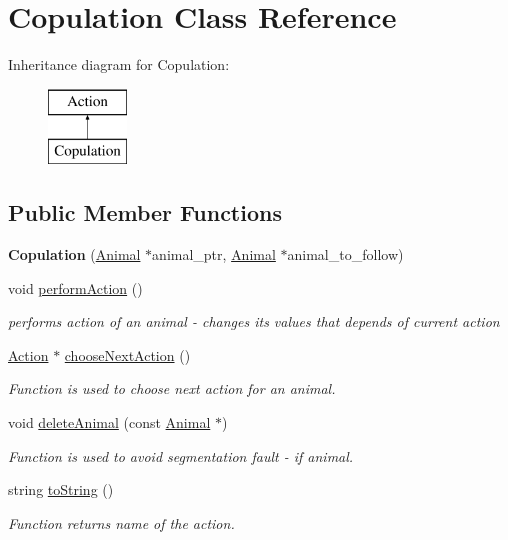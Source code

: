 \hypertarget{class_copulation}{}\section{Copulation Class Reference}
\label{class_copulation}
Inheritance diagram for Copulation\+:\begin{figure}[H]
\begin{center}
\leavevmode
\includegraphics[height=2.000000cm]{class_copulation}
\end{center}
\end{figure}
\subsection*{Public Member Functions}
\begin{DoxyCompactItemize}
\item 
\hypertarget{class_copulation_a2260fde409e5e713ba90b6cedc2c1769}{}{\bfseries Copulation} (\hyperlink{class_animal}{Animal} $\ast$animal\+\_\+ptr, \hyperlink{class_animal}{Animal} $\ast$animal\+\_\+to\+\_\+follow)\label{class_copulation_a2260fde409e5e713ba90b6cedc2c1769}

\item 
void \hyperlink{class_copulation_ae84cabc1a26df3f94032b6f1df3ff5b9}{perform\+Action} ()
\begin{DoxyCompactList}\small\item\em performs action of an animal -\/ changes it\textquotesingle{}s values that depends of current action \end{DoxyCompactList}\item 
\hyperlink{class_action}{Action} $\ast$ \hyperlink{class_copulation_af3fa52c2093c2f88d0fbaba9ea0209b7}{choose\+Next\+Action} ()
\begin{DoxyCompactList}\small\item\em Function is used to choose next action for an animal. \end{DoxyCompactList}\item 
void \hyperlink{class_copulation_aa13219c19de17875ba71411b1a38f2cc}{delete\+Animal} (const \hyperlink{class_animal}{Animal} $\ast$)
\begin{DoxyCompactList}\small\item\em Function is used to avoid segmentation fault -\/ if animal. \end{DoxyCompactList}\item 
string \hyperlink{class_copulation_a111bbe080ab451f6fa070345281b76ee}{to\+String} ()
\begin{DoxyCompactList}\small\item\em Function returns name of the action. \end{DoxyCompactList}\end{DoxyCompactItemize}
